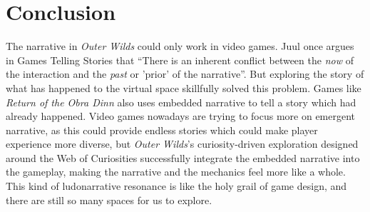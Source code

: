 \documentclass[doc, biblatex]{apa6}
\begin{document}
\section{Conclusion}
The narrative in \textit{Outer Wilds} could only work in video games. Juul once
argues in Games Telling Stories that ``There is an inherent conflict between the
\textit{now} of the interaction and the \textit{past} or 'prior' of the
narrative''\parencite{juul2001games}. But exploring the story of what has
happened to the virtual space skillfully solved this problem. Games like
\textit{Return of the Obra Dinn} also uses embedded narrative to tell a story
which had already happened. Video games nowadays are trying to focus more on
emergent narrative, as this could provide endless stories which could make
player experience more diverse, but \textit{Outer Wilds}'s curiosity-driven
exploration designed around the Web of Curiosities successfully integrate the
embedded narrative into the gameplay, making the narrative and the mechanics
feel more like a whole. This kind of ludonarrative resonance is like the holy
grail of game design, and there are still so many spaces for us to explore.
\printbibliography
\end{document}
